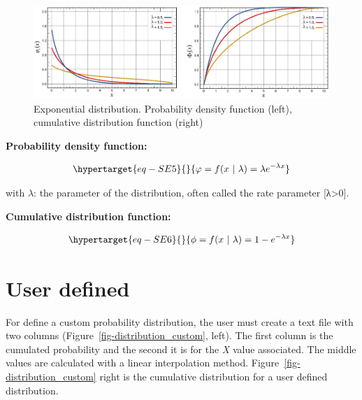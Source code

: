 \documentclass[
  letterpaper,
  DIV=11,
  numbers=noendperiod]{scrreprt}
\begin{document}
\begin{figure}

{\centering \includegraphics{./figures/fig-distribution_exponential.png}

}

\caption{\label{fig-distribution_exponential}Exponential distribution.
Probability density function (left), cumulative distribution function
(right)}

\end{figure}

\textbf{Probability density function:}

\begin{equation}\protect\hypertarget{eq-SE5}{}{
\varphi = f(x\ |\ \lambda) = \lambda e^{- \lambda x}
}\label{eq-SE5}\end{equation}

with \(\lambda\): the parameter of the distribution, often called the
rate parameter {[}λ\textgreater0{]}.

\textbf{Cumulative distribution function:}

\begin{equation}\protect\hypertarget{eq-SE6}{}{
\phi = f(x\ |\ \lambda) = 1 - e^{- \lambda x}
}\label{eq-SE6}\end{equation}

\hypertarget{user-defined}{%
\section{User defined}\label{user-defined}}

For define a custom probability distribution, the user must create a
text file with two columns (Figure~\ref{fig-distribution_custom}, left).
The first column is the cumulated probability and the second it is for
the \emph{X} value associated. The middle values are calculated with a
linear interpolation method. Figure~\ref{fig-distribution_custom} right
is the cumulative distribution for a user defined distribution.
\end{document}
